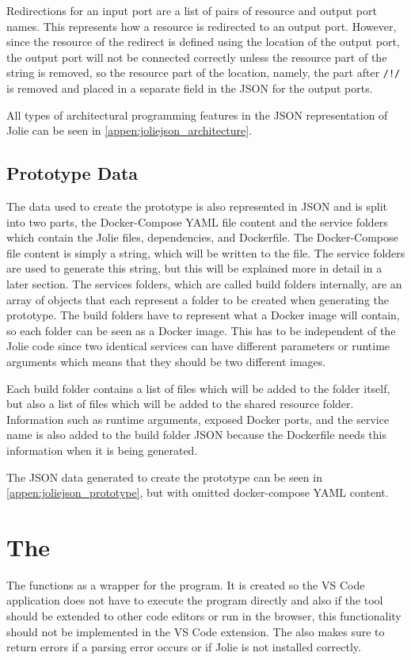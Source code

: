 Redirections for an input port are a list of pairs of resource and output port names. This represents how a resource is redirected to an output port.
However, since the resource of the redirect is defined using the location of the output port, the output port will not be connected correctly unless the resource part of the string is removed, so the resource part of the location, namely,
the part after \texttt{/!/} is removed and placed in a separate field in the JSON for the output ports.

All types of architectural programming features in the JSON representation of Jolie can be seen in \cref{appen:joliejson_architecture}.

\subsection{Prototype Data}
The data used to create the prototype is also represented in JSON and is split into two parts, the Docker-Compose YAML file content and the service folders which contain the Jolie files, dependencies, and Dockerfile.
The Docker-Compose file content is simply a string, which will be written to the file. The service folders are used to generate this string, but this will be explained more in detail in a later section.
The services folders, which are called build folders internally, are an array of objects that each represent a folder to be created when generating the prototype.
The build folders have to represent what a Docker image will contain, so each folder can be seen as a Docker image. This has to be independent of the Jolie code since two identical services can have different parameters or runtime arguments which means that they should be two different images.

Each build folder contains a list of files which will be added to the folder itself, but also a list of files which will be added to the shared resource folder.
Information such as runtime arguments, exposed Docker ports, and the service name is also added to the build folder JSON because the Dockerfile needs this information when it is being generated.

The JSON data generated to create the prototype can be seen in \cref{appen:joliejson_prototype}, but with omitted docker-compose YAML content.

\section{The \nodetoolname[]}
The \nodetoolname[] functions as a wrapper for the \javatoolname[] program. It is created so the VS Code application does not have to execute the \javatoolname[] program directly and also if the tool should be extended to other code editors or run in the browser, this functionality should not be implemented in the VS Code extension.
The \nodetoolname[] also makes sure to return errors if a parsing error occurs or if Jolie is not installed correctly.

